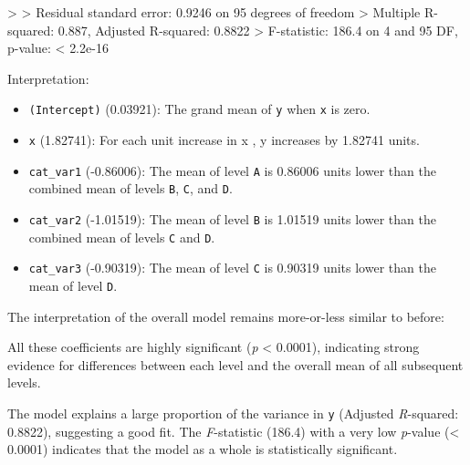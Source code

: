 \documentclass[
  letterpaper,
]{book}
\newenvironment{Shaded}{\begin{snugshade}}{\end{snugshade}}
\newcommand{\DecValTok}[1]{\textcolor[rgb]{0.68,0.00,0.00}{#1}}
\newcommand{\ErrorTok}[1]{\textcolor[rgb]{0.68,0.00,0.00}{#1}}
\newcommand{\FloatTok}[1]{\textcolor[rgb]{0.68,0.00,0.00}{#1}}
\newcommand{\NormalTok}[1]{\textcolor[rgb]{0.00,0.23,0.31}{#1}}
\newcommand{\SpecialCharTok}[1]{\textcolor[rgb]{0.37,0.37,0.37}{#1}}
\providecommand{\tightlist}{%
  \setlength{\itemsep}{0pt}\setlength{\parskip}{0pt}}\usepackage{longtable,booktabs,array}
\begin{document}
\begin{Shaded}
\begin{Highlighting}[]
\SpecialCharTok{\textgreater{}} 
\ErrorTok{\textgreater{}}\NormalTok{ Residual standard error}\SpecialCharTok{:} \FloatTok{0.9246}\NormalTok{ on }\DecValTok{95}\NormalTok{ degrees of freedom}
\SpecialCharTok{\textgreater{}}\NormalTok{ Multiple R}\SpecialCharTok{{-}}\NormalTok{squared}\SpecialCharTok{:}  \FloatTok{0.887}\NormalTok{,   Adjusted R}\SpecialCharTok{{-}}\NormalTok{squared}\SpecialCharTok{:}  \FloatTok{0.8822} 
\SpecialCharTok{\textgreater{}}\NormalTok{ F}\SpecialCharTok{{-}}\NormalTok{statistic}\SpecialCharTok{:} \FloatTok{186.4}\NormalTok{ on }\DecValTok{4}\NormalTok{ and }\DecValTok{95}\NormalTok{ DF,  p}\SpecialCharTok{{-}}\NormalTok{value}\SpecialCharTok{:} \ErrorTok{\textless{}} \FloatTok{2.2e{-}16}
\end{Highlighting}
\end{Shaded}

Interpretation:

\begin{itemize}
\tightlist
\item
  \texttt{(Intercept)} (0.03921): The grand mean of \texttt{y} when
  \texttt{x} is zero.
\item
  \texttt{x} (1.82741): For each unit increase in x , y increases by
  1.82741 units.
\item
  \texttt{cat\_var1} (-0.86006): The mean of level \texttt{A} is 0.86006
  units lower than the combined mean of levels \texttt{B}, \texttt{C},
  and \texttt{D}.
\item
  \texttt{cat\_var2} (-1.01519): The mean of level \texttt{B} is 1.01519
  units lower than the combined mean of levels \texttt{C} and
  \texttt{D}.
\item
  \texttt{cat\_var3} (-0.90319): The mean of level \texttt{C} is 0.90319
  units lower than the mean of level \texttt{D}.
\end{itemize}

The interpretation of the overall model remains more-or-less similar to
before:

All these coefficients are highly significant (\emph{p} \textless{}
0.0001), indicating strong evidence for differences between each level
and the overall mean of all subsequent levels.

The model explains a large proportion of the variance in \texttt{y}
(Adjusted \emph{R}-squared: 0.8822), suggesting a good fit. The
\emph{F}-statistic (186.4) with a very low \emph{p}-value (\textless{}
0.0001) indicates that the model as a whole is statistically
significant.
\end{document}
